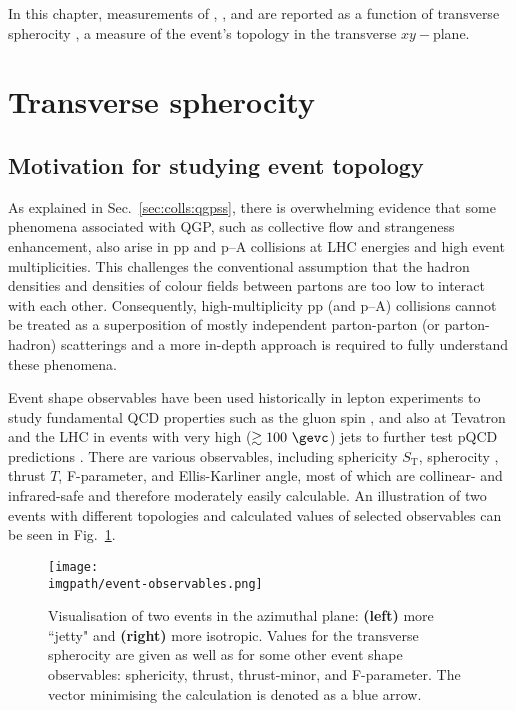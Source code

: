 \def \imgpath {"./figures/sphero"}
\label{chap:sphero}
In this chapter, measurements of \KOs, \LA, and \AL are reported as a function of transverse spherocity \SOPT, a measure of the event's topology in the transverse $xy-$plane. 
\section{Transverse spherocity}

\subsection{Motivation for studying event topology}

As explained in Sec.~\ref{sec:colls:qgpss}, there is overwhelming evidence that some phenomena associated with QGP, such as collective flow and strangeness enhancement, also arise in pp and p--A collisions at LHC energies and high event multiplicities. This challenges the conventional assumption that the hadron densities and densities of colour fields between partons are too low to interact with each other. Consequently, high-multiplicity pp (and p--A) collisions cannot be treated as a superposition of mostly independent parton-parton (or parton-hadron) scatterings and a more in-depth approach  is required to fully understand these phenomena.

Event shape observables have been used historically in lepton experiments to study fundamental QCD properties such as the gluon spin \cite{brandelikEvidenceSpin1Gluon1980}, and also at Tevatron and the LHC in events with very high \pt ($\gtrsim 100~\gevc$) jets to further test pQCD predictions \cite{ortizExperimentalResultsEvent2018}. There are various observables, including sphericity $S_\mathrm{T}$, spherocity \SO, thrust $T$, F-parameter, and Ellis-Karliner angle, most of which are collinear- and infrared-safe and therefore moderately easily calculable\cite{banfiPhenomenologyEventShapes2010}. An illustration of two events with different topologies and calculated values of selected observables can be seen in Fig.~\ref{fig:sphero:topologies}.

\begin{figure}%
\texttt{[image: \\imgpath/event-observables.png]}
\caption{Visualisation of two events in the azimuthal plane: \textbf{(left)} more ``jetty" and \textbf{(right)} more isotropic. Values for the transverse spherocity \SO are given as well as for some other event shape observables: sphericity, thrust, thrust-minor, and F-parameter. The vector minimising the \SO calculation is denoted as a blue arrow. \cite{ortizExperimentalResultsEvent2018}}
\label{fig:sphero:topologies}
\end{figure}

